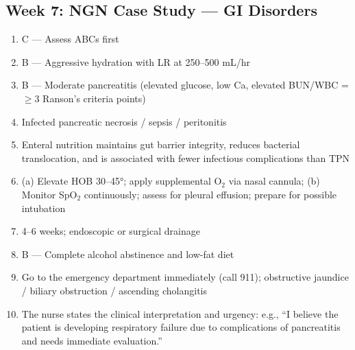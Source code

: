 \documentclass[11pt,letterpaper]{article}
\begin{document}
\begin{keybox}
\subsection*{Week 7: NGN Case Study --- GI Disorders}
\begin{enumerate}[leftmargin=1.5em,label=\textbf{\arabic*.},start=61]
  \item C --- Assess ABCs first
  \item B --- Aggressive hydration with LR at 250--500 mL/hr
  \item B --- Moderate pancreatitis (elevated glucose, low Ca, elevated BUN/WBC = $\geq$3
        Ranson's criteria points)
  \item Infected pancreatic necrosis / sepsis / peritonitis
  \item Enteral nutrition maintains gut barrier integrity, reduces bacterial translocation,
        and is associated with fewer infectious complications than TPN
  \item (a) Elevate HOB 30--45°; apply supplemental O$_2$ via nasal cannula;
        (b) Monitor SpO$_2$ continuously; assess for pleural effusion; prepare for
        possible intubation
  \item 4--6 weeks; endoscopic or surgical drainage
  \item B --- Complete alcohol abstinence and low-fat diet
  \item Go to the emergency department immediately (call 911); obstructive jaundice /
        biliary obstruction / ascending cholangitis
  \item The nurse states the clinical interpretation and urgency: e.g., ``I believe the
        patient is developing respiratory failure due to complications of pancreatitis and
        needs immediate evaluation.''
\end{enumerate}

\hrulefill

\end{keybox}
\end{document}
